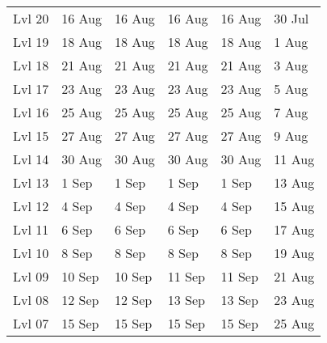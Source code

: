 \begin{table}[htbp]
\begin{tabular}{llllll}
Lvl 20  & 16 Aug   &16 Aug          &16 Aug         &16 Aug         &30 Jul\\
Lvl 19  & 18 Aug   &18 Aug           &18 Aug         &18 Aug         &1 Aug\\
Lvl 18  & 21 Aug   &21 Aug & 21 Aug                  &21 Aug         &3 Aug\\
Lvl 17  & 23 Aug   &23 Aug  &23 Aug         &23 Aug         &5 Aug\\
Lvl 16  & 25 Aug   &25 Aug  &25 Aug         &25 Aug         &7 Aug\\
Lvl 15  & 27 Aug   &27 Aug  &27 Aug         &27 Aug         &9 Aug\\
Lvl 14  & 30 Aug   &30 Aug  &30 Aug         &30 Aug         &11 Aug\\
Lvl 13  & 1 Sep     &1 Sep    &1 Sep         &1 Sep         &13 Aug\\
Lvl 12  & 4 Sep     &4 Sep    & 4 Sep        &4 Sep         &15 Aug\\
Lvl 11  & 6 Sep     &6 Sep    & 6 Sep        &6 Sep         &17 Aug\\
Lvl 10  & 8 Sep     &8 Sep    & 8 Sep        &8 Sep         &19 Aug\\
Lvl 09  & 10 Sep   &10 Sep   & 11 Sep        &11 Sep         &21 Aug\\
Lvl 08  & 12 Sep   &12 Sep   & 13 Sep        &13 Sep         &23 Aug\\
Lvl 07  & 15 Sep   &15 Sep   & 15 Sep        &15 Sep         &25 Aug\\
\bottomrule
\end{tabular}
\normalsize
\end{table}




















